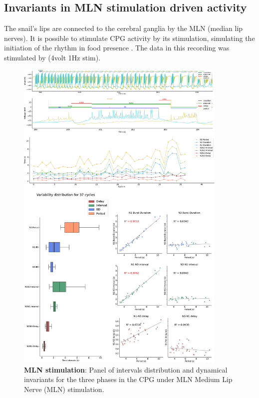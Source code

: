 \subsection{Invariants in MLN stimulation driven activity}
The snail's lips are connected to the cerebral ganglia by the MLN (median lip nerves). It is possible to stimulate CPG activity by its stimulation, simulating the initiation of the rhythm in food presence \parencite{staras_electrophysiological_2019}. The data in this recording was stimulated by (4volt 1Hz stim).


\begin{figure}[htbp]
	\centering
	\includegraphics[width=0.9\textwidth]{./invariants/data/SUSSEX/MLN_driven/images/panel_with_intervals.pdf}
	\caption{\textbf{MLN stimulation}: Panel of intervals distribution and dynamical invariants for the three phases in the CPG under MLN Medium Lip Nerve (MLN) stimulation.}
	\label{fig:mln stimulation}
\end{figure}


